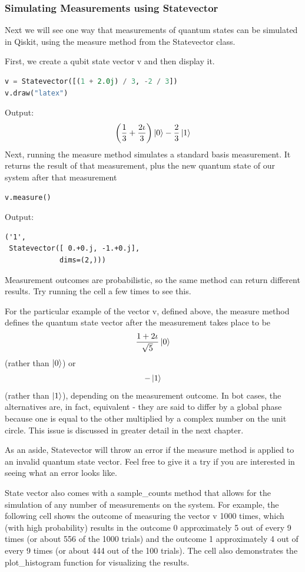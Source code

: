 \subsubsection{Simulating Measurements using Statevector}
Next we will see one way that measurements of quantum states can be simulated in Qiskit, using the  measure  method from the  Statevector  class.

First, we create a qubit state vector  v  and then display it.
\begin{lstlisting}[language=Python]
v = Statevector([(1 + 2.0j) / 3, -2 / 3])
v.draw("latex")
\end{lstlisting}
Output:
\[
\left(\frac{1}{3}+\frac{2\iota}{3}\right)\ket{0}-\frac{2}{3}\ket{1}
\]
Next, running the  measure  method simulates a standard basis measurement. It returns the result of that measurement, plus the new quantum state of our system after that measurement
\begin{lstlisting}[language=Python]
v.measure()
\end{lstlisting}
Output:
\begin{lstlisting}
('1',
 Statevector([ 0.+0.j, -1.+0.j],
             dims=(2,)))
\end{lstlisting}
Measurement outcomes are probabilistic, so the same method can return different results. Try running the cell a few times to see this. 

For the particular example of the vector v, defined above, the measure method defines the quantum state vector after the measurement takes place to be
\[
\frac{1+2\iota}{\sqrt{5}}\ket{0}
\]
(rather than $\ket{0}$) or
\[
-\ket{1}
\]
(rather than $\ket{1}$), depending on the measurement outcome. In bot cases, the alternatives are, in fact, equivalent - they are said to differ by a global phase because one is equal to the other multiplied by a complex number on the unit circle. This issue is discussed in greater detail in the next chapter.

As an aside, Statevector will throw an error if the measure method is applied to an invalid quantum state vector. Feel free to give it a try if you are interested in seeing what an error looks like.

State vector also comes with a sample\_counts method that allows for the simulation of any number of measurements on the system. For example, the following cell shows the outcome of measuring the vector v 1000 times, which (with high probability) results in the outcome 0 approximately 5 out of every 9 times (or about 556 of the 1000 trials) and the outcome 1 approximately 4 out of every 9 times (or about 444 out of the 100 trials). The cell also demonstrates the plot\_histogram function for visualizing the results.

